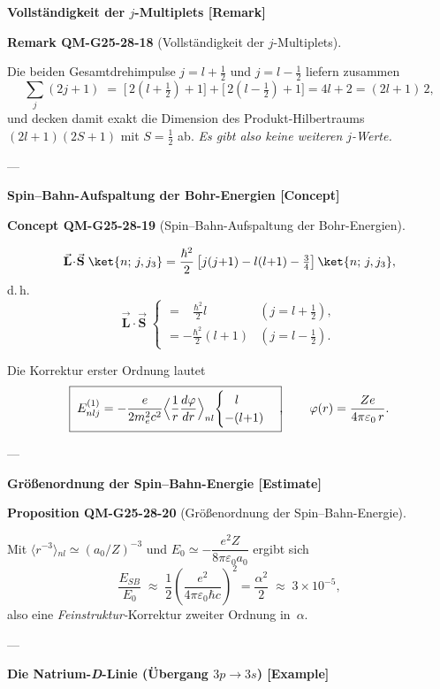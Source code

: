 \documentclass[10pt, letterpaper]{article}
\newcommand{\CustomHeading}[3]{%
  \par\medskip\noindent%
  \textbf{#1 #2} \textnormal{(#3)}.\enskip%
}
\newenvironment{PROP}[2]{\begin{unitbox}\CustomHeading{Proposition}{#1}{#2}}{\end{unitbox}}
\newenvironment{REM}[2]{\begin{unitbox}\CustomHeading{Remark}{#1}{#2}}{\end{unitbox}}
\newenvironment{CONC}[2]{\begin{unitbox}\CustomHeading{Concept}{#1}{#2}}{\end{unitbox}}
\begin{document}
\textbf{Vollständigkeit der $j$-Multiplets [Remark]}

\begin{REM}{QM-G25-28-18}{Vollständigkeit der $j$-Multiplets}
Die beiden Gesamtdrehimpulse
\(j=l+\tfrac12\) und \(j=l-\tfrac12\)
liefern zusammen
\[
\sum_j (2j+1)\;=\;
\bigl[\,2(l+\tfrac12)+1\bigr]+\bigl[\,2(l-\tfrac12)+1\bigr]
= 4l+2
= (2l+1)\,2,
\]
und decken damit exakt die Dimension des Produkt-Hilbertraums
\((2l+1)(2S+1)\) mit \(S=\tfrac12\) ab.  
\emph{Es gibt also keine weiteren $j$-Werte.}
\end{REM}

---

\textbf{Spin–Bahn-Aufspaltung der Bohr-Energien [Concept]}

\begin{CONC}{QM-G25-28-19}{Spin–Bahn-Aufspaltung der Bohr-Energien}
\[
\vec{\mathbf L}\!\cdot\!\vec{\mathbf S}\;\ket{n;\,j,j_3}=
\frac{\hbar^2}{2}\,
\bigl[j(j{+}1)-l(l{+}1)-\tfrac34\bigr]\,\ket{n;\,j,j_3},
\]
d.\,h.
\[
\vec{\mathbf L}\!\cdot\!\vec{\mathbf S}\;
\begin{cases}
\displaystyle =\;\;\;\frac{\hbar^2}{2}l & (j=l+\tfrac12),\\[6pt]
\displaystyle =-\frac{\hbar^2}{2}(l{+}1) & (j=l-\tfrac12).
\end{cases}
\]

Die Korrektur erster Ordnung lautet
\[
\boxed{\;
E_{nlj}^{(1)}=
-\frac{e}{2m_e^{2}c^{2}}
\Bigl\langle\frac1r\frac{d\varphi}{dr}\Bigr\rangle_{n l}\!
\begin{cases}
\;\;\;l\\
-(l{+}1)
\end{cases}}\!,
\qquad
\varphi(r)=\dfrac{Ze}{4\pi\varepsilon_0\,r}.
\]
\end{CONC}

---

\textbf{Größenordnung der Spin–Bahn-Energie [Estimate]}

\begin{PROP}{QM-G25-28-20}{Größenordnung der Spin–Bahn-Energie}
Mit
\(
\langle r^{-3}\rangle\!_{nl}\!\simeq\!(a_0/Z)^{-3}
\)
und
\(
E_0\simeq-\dfrac{e^{2}Z}{8\pi\varepsilon_0 a_0}
\)
ergibt sich
\[
\frac{E_{SB}}{E_0}\;\approx\;
\frac{1}{2}\left(\frac{e^{2}}{4\pi\varepsilon_0\hbar c}\right)^{2}
=\frac{\alpha^{2}}{2}\;\approx\;3\times10^{-5},
\]
also eine \emph{Feinstruktur-}Korrektur zweiter Ordnung in~$\alpha$.
\end{PROP}

---

\textbf{Die Natrium-\emph{D}-Linie (Übergang $3p\!\to\!3s$) [Example]}
\end{document}
